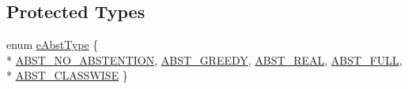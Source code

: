 \subsection*{Protected Types}
\begin{DoxyCompactItemize}
\item 
enum \hyperlink{classMultiBoost_1_1AbstainableLearner_a913d773affdee935e319707266a29599}{e\-Abst\-Type} \{ \\*
\hyperlink{classMultiBoost_1_1AbstainableLearner_a913d773affdee935e319707266a29599a2019394277d4056625d018cb98290412}{A\-B\-S\-T\-\_\-\-N\-O\-\_\-\-A\-B\-S\-T\-E\-N\-T\-I\-O\-N}, 
\hyperlink{classMultiBoost_1_1AbstainableLearner_a913d773affdee935e319707266a29599a0c1ea3b4f4af6824ccb863083529176a}{A\-B\-S\-T\-\_\-\-G\-R\-E\-E\-D\-Y}, 
\hyperlink{classMultiBoost_1_1AbstainableLearner_a913d773affdee935e319707266a29599af384457b42d884fdeb23e551f7791a35}{A\-B\-S\-T\-\_\-\-R\-E\-A\-L}, 
\hyperlink{classMultiBoost_1_1AbstainableLearner_a913d773affdee935e319707266a29599abc37ef32ac283b194557d98f66e33312}{A\-B\-S\-T\-\_\-\-F\-U\-L\-L}, 
\\*
\hyperlink{classMultiBoost_1_1AbstainableLearner_a913d773affdee935e319707266a29599afeeef2eabc861fca37f0932bc11cfff8}{A\-B\-S\-T\-\_\-\-C\-L\-A\-S\-S\-W\-I\-S\-E}
 \}
\end{DoxyCompactItemize}
